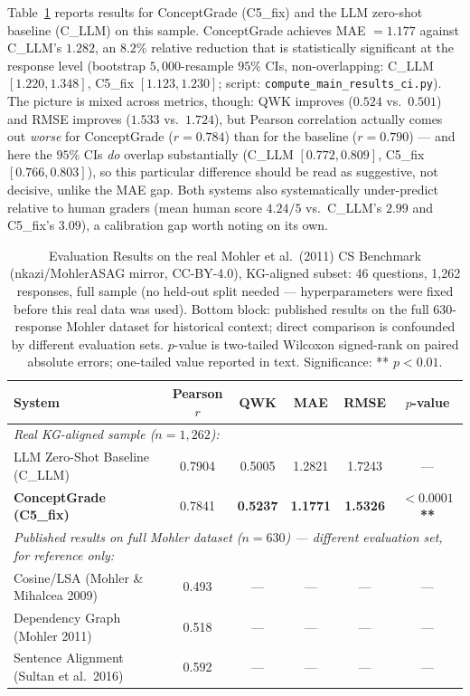 \documentclass[conference]{IEEEtran}
\begin{document}
Table~\ref{tab:main_results} reports results for ConceptGrade
(C5\_fix) and the LLM zero-shot baseline (C\_LLM) on this sample.
ConceptGrade achieves MAE $=1.177$ against C\_LLM's $1.282$, an
$8.2\%$ relative reduction that is statistically significant at the
response level (bootstrap $5{,}000$-resample $95\%$ CIs,
non-overlapping: C\_LLM $[1.220, 1.348]$, C5\_fix $[1.123, 1.230]$;
script: \texttt{compute\_main\_results\_ci.py}). The picture is mixed
across metrics, though: QWK improves ($0.524$ vs.\ $0.501$) and RMSE
improves ($1.533$ vs.\ $1.724$), but Pearson correlation actually
comes out \emph{worse} for ConceptGrade ($r=0.784$) than for the
baseline ($r=0.790$) --- and here the $95\%$ CIs \emph{do} overlap
substantially (C\_LLM $[0.772, 0.809]$, C5\_fix $[0.766, 0.803]$), so
this particular difference should be read as suggestive, not
decisive, unlike the MAE gap. Both systems also systematically
under-predict relative to human graders (mean human score $4.24/5$
vs.\ C\_LLM's $2.99$ and C5\_fix's $3.09$), a calibration gap worth
noting on its own.

\begin{table}[t]
\caption{Evaluation Results on the real Mohler et al.\ (2011) CS Benchmark
         (nkazi/MohlerASAG mirror, CC-BY-4.0), KG-aligned subset: 46
         questions, 1{,}262 responses, full sample (no held-out split
         needed --- hyperparameters were fixed before this real data was
         used). Bottom block: published results on the full 630-response
         Mohler dataset for historical context; direct comparison is
         confounded by different evaluation sets. $p$-value is two-tailed
         Wilcoxon signed-rank on paired absolute errors; one-tailed value
         reported in text. Significance: ** $p < 0.01$.}
\label{tab:main_results}
\centering
\begin{tabular}{lccccc}
\toprule
\textbf{System} &
\textbf{Pearson $r$} &
\textbf{QWK} &
\textbf{MAE} &
\textbf{RMSE} &
\textbf{$p$-value} \\
\midrule
\multicolumn{6}{l}{\textit{Real KG-aligned sample ($n = 1{,}262$):}} \\
LLM Zero-Shot Baseline (C\_LLM) &
  0.7904 & 0.5005 & 1.2821 & 1.7243 & --- \\
\textbf{ConceptGrade (C5\_fix)} &
  0.7841 & \textbf{0.5237} & \textbf{1.1771} & \textbf{1.5326} & \textbf{$<0.0001$**} \\
\midrule
\multicolumn{6}{l}{\textit{Published results on full Mohler dataset ($n=630$) --- different evaluation set, for reference only:}} \\
\quad Cosine/LSA (Mohler \& Mihalcea 2009) \cite{mohler2009}         & 0.493 & --- & --- & --- & --- \\
\quad Dependency Graph (Mohler 2011) \cite{mohler2011}               & 0.518 & --- & --- & --- & --- \\
\quad Sentence Alignment (Sultan et al.\ 2016) \cite{sultan2016}     & 0.592 & --- & --- & --- & --- \\
\bottomrule
\end{tabular}
\end{table}
\end{document}

